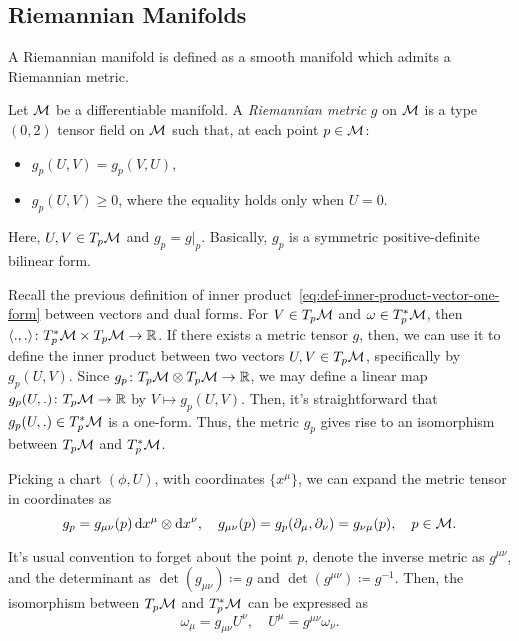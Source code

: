 \subsection{Riemannian Manifolds}
A Riemannian manifold is defined as a smooth manifold which admits a Riemannian metric.

\begin{definition}
	Let $\mathcal{M}$ be a differentiable manifold. A \emph{Riemannian metric} $g$ on $\mathcal{M}$ is a type $(0,2)$ tensor field on $\mathcal{M}$ such that, at each point $p \in \mathcal{M}$:
	\begin{itemize}
		\item $g_p (U,V) = g_p (V,U)$,
		\item $g_p(U,V) \geq 0$, where the equality holds only when $U=0$.
	\end{itemize}
	Here, $U,V \in T_p \mathcal{M}$ and $g_p = g|_p$. Basically, $g_p$ is a symmetric positive-definite bilinear form.
\end{definition}

Recall the previous definition of inner product~\eqref{eq:def-inner-product-vector-one-form} between vectors and dual forms. For $V \in T_p \mathcal{M}$ and $\omega \in T^*_p \mathcal{M}$, then $\langle ., . \rangle \colon T^*_p \mathcal{M} \times T_p \mathcal{M} \to \mathbb{R}$. If there exists a metric tensor $g$, then, we can use it to define the inner product between two vectors $U,V \in T_p \mathcal{M}$, specifically by $g_p(U,V)$. Since $g_p \colon T_p \mathcal{M} \otimes T_p \mathcal{M} \to \mathbb{R}$, we may define a linear map $g_p(U,.) \colon T_p \mathcal{M} \to \mathbb{R}$ by $V \mapsto g_p(U,V)$. Then, it's straightforward that $g_p(U,.) \in T^*_p \mathcal{M}$ is a one-form. Thus, the metric $g_p$ gives rise to an isomorphism between $T_p \mathcal{M}$ and $T^*_p \mathcal{M}$.

Picking a chart $(\phi,U)$, with coordinates $\{ x^\mu \}$, we can expand the metric tensor in coordinates as
\begin{equation}
	g_p = g_{\mu\nu}(p) \mathop{}\!\mathrm{d} x^\mu \otimes \mathop{}\!\mathrm{d} x^\nu, \quad g_{\mu\nu}(p) = g_p (\partial_\mu, \partial_\nu) = g_{\nu\mu}(p), \quad p \in \mathcal{M}.
\end{equation}

It's usual convention to forget about the point $p$, denote the inverse metric as $g^{\mu\nu}$, and the determinant as $\det(g_{\mu\nu}) \coloneq g$ and $\det(g^{\mu\nu}) \coloneq g^{-1}$. Then, the isomorphism between $T_p \mathcal{M}$ and $T^*_p \mathcal{M}$ can be expressed as
\begin{equation}
	\omega_\mu = g_{\mu\nu} U^\nu, \quad U^\mu = g^{\mu\nu} \omega_\nu .
\end{equation}

